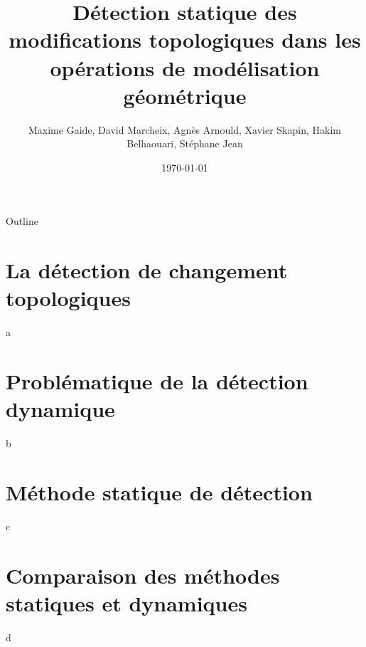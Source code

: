 \documentclass[presentation]{beamer}
\author{Maxime Gaide, David Marcheix, Agnès Arnould, Xavier Skapin, Hakim Belhaouari, Stéphane Jean}
\date{\today}
\title{Détection statique des modifications topologiques dans les opérations de modélisation géométrique}
\begin{document}
\maketitle
\begin{frame}{Outline}
\tableofcontents
\end{frame}

\section{La détection de changement topologiques}
\label{sec:orgeee8a92}
a
\section{Problématique de la détection dynamique}
\label{sec:org0d51896}
b
\section{Méthode statique de détection}
\label{sec:org778a430}
c
\section{Comparaison des méthodes statiques et dynamiques}
\label{sec:org54aef30}
d
\end{document}
